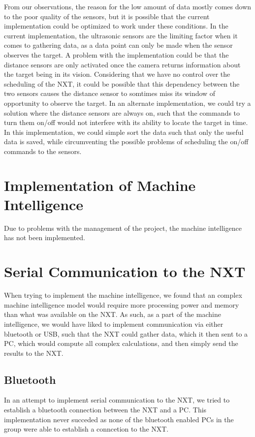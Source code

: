 From our observations, the reason for the low amount of data mostly comes down
to the poor quality of the sensors, but it is possible that the current
implementation could be optimized to work under these conditions. In the current
implementation, the ultrasonic sensors are the limiting factor when it comes to
gathering data, as a data point can only be made when the sensor observes the
target.\nl
A problem with the implementation could be that the distance sensors are only
activated once the camera returns information about the target being in its
vision. Considering that we have no control over the scheduling of the NXT, it
could be possible that this dependency between the two sensors causes the
distance sensor to somtimes miss its window of opportunity to observe the
target.\nl
In an alternate implementation, we could try a solution where the distance
sensors are always on, such that the commands to turn them on/off would not
interfere with its ability to locate the target in time. In this implementation,
we could simple sort the data such that only the useful data is saved, while
circumventing the possible problems of scheduling the on/off commands to the
sensors.

\section{Implementation of Machine Intelligence}
Due to problems with the management of the project, the machine intelligence has
not been implemented.

\section{Serial Communication to the NXT}
When trying to implement the machine intelligence, we found that an complex
machine intelligence model would require more processing power and memory than
what was available on the NXT. As such, as a part of the machine intelligence,
we would have liked to implement communication via either bluetooth or USB, such
that the NXT could gather data, which it then sent to a PC, which would compute
all complex calculations, and then simply send the results to the NXT.

\subsection{Bluetooth}
In an attempt to implement serial communication to the NXT, we tried to
establish a bluetooth connection between the NXT and a PC. This implementation
never succeded as none of the bluetooth enabled PCs in the group were able to
establish a conncetion to the NXT.\nl

